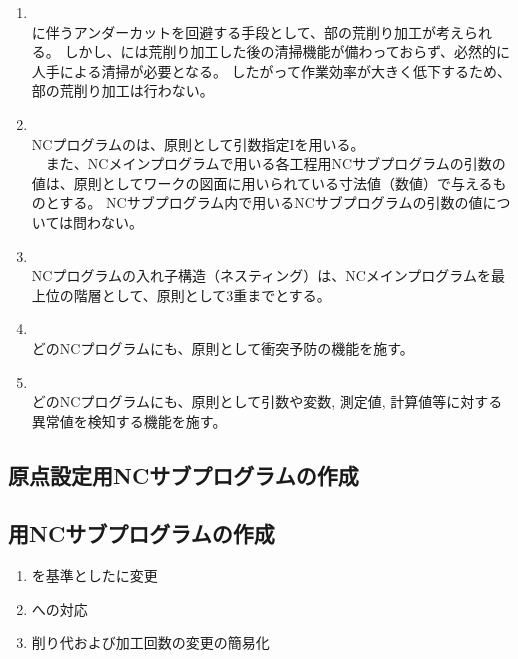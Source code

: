 \begin{enumerate}[label*=\alph*)]
\item {}\\
\DimpleMilling に伴うアンダーカットを回避する手段として、\EndFace 部の荒削り加工が考えられる。
しかし、\DMC には荒削り加工した後の清掃機能が備わっておらず、必然的に人手による清掃が必要となる。
したがって作業効率が大きく低下するため、\EndFace 部の荒削り加工は行わない。
\item {}\\
NCプログラムのは、原則として引数指定Iを用いる。\\
　また、NCメインプログラムで用いる各工程用NCサブプログラムの引数の値は、原則としてワークの図面に用いられている寸法値（数値）で与えるものとする。
NCサブプログラム内で用いるNCサブプログラムの引数の値については問わない。
\item {}\\
NCプログラムの入れ子構造（ネスティング）は、NCメインプログラムを最上位の階層として、原則として3重までとする。
\item {}\\
どのNCプログラムにも、原則として衝突予防の機能を施す。
\item {}\\
どのNCプログラムにも、原則として引数や変数, 測定値, 計算値等に対する異常値を検知する機能を施す。
\end{enumerate}


\clearpage
\subsection{原点設定用NCサブプログラムの作成\TBW}


\subsection{\EndFacecutMilling 用NCサブプログラムの作成\TBW}
\begin{enumerate}[label=\sarrow]
\item \IDCenter を基準とした\EndFacecutMilling に変更
\item \ODCornerR への対応
\item {}削り代および加工回数の変更の簡易化
\end{enumerate}


